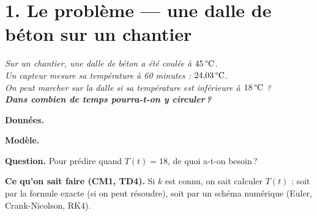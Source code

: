 \section*{1. Le problème --- une dalle de béton sur un chantier}

\begin{center}
\begin{mdframed}[backgroundcolor=ThemeLight, linecolor=Theme,
  linewidth=1.5pt, innertopmargin=10pt, innerbottommargin=10pt]
\centering\large\itshape
Sur un chantier, une dalle de béton a été coulée à $45\,\text{\textdegree C}$.\\
Un capteur mesure sa température à 60 minutes : $24{,}03\,\text{\textdegree C}$.\\
On peut marcher sur la dalle si sa température est inférieure à $18\,\text{\textdegree C}$ ?\\
\textbf{Dans combien de temps pourra-t-on y circuler\,?}
\end{mdframed}
\end{center}

\bigskip

\textbf{Données.}
\medskip

\textbf{Modèle.}

\medskip

\textbf{Question.}
Pour prédire quand $T(t) = 18$, de quoi a-t-on besoin\,?


\medskip

\textbf{Ce qu'on sait faire (CM1, TD4).}
Si $k$ est connu, on sait calculer $T(t)$ :
soit par la formule exacte (si on peut résoudre),
soit par un schéma numérique
(Euler, Crank-Nicolson, RK4).

